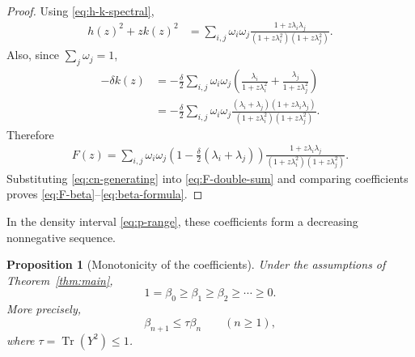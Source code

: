 \documentclass[11pt]{article}
\newtheorem{proposition}[theorem]{Proposition}
\newcommand{\Tr}{\operatorname{Tr}}
\begin{document}
\begin{proof}
Using \eqref{eq:h-k-spectral},
\begin{align*}
 h(z)^2+zk(z)^2
 &=\sum_{i,j}\omega_i\omega_j
   \frac{1+z\lambda_i\lambda_j}
   {(1+z\lambda_i^2)(1+z\lambda_j^2)}.
\end{align*}
Also, since $\sum_j\omega_j=1$,
\begin{align*}
 -\delta k(z)
 &=-\frac{\delta}{2}\sum_{i,j}\omega_i\omega_j
 \left(
   \frac{\lambda_i}{1+z\lambda_i^2}
   +\frac{\lambda_j}{1+z\lambda_j^2}
 \right)\\
 &=-\frac{\delta}{2}\sum_{i,j}\omega_i\omega_j
 \frac{(\lambda_i+\lambda_j)(1+z\lambda_i\lambda_j)}
 {(1+z\lambda_i^2)(1+z\lambda_j^2)}.
\end{align*}
Therefore
\begin{align}
 F(z)
 =\sum_{i,j}\omega_i\omega_j
 \left(1-\frac{\delta}{2}(\lambda_i+\lambda_j)\right)
 \frac{1+z\lambda_i\lambda_j}
 {(1+z\lambda_i^2)(1+z\lambda_j^2)}.
 \label{eq:F-double-sum}
\end{align}
Substituting \eqref{eq:cn-generating} into \eqref{eq:F-double-sum} and comparing coefficients proves \eqref{eq:F-beta}--\eqref{eq:beta-formula}.
\end{proof}

In the density interval \eqref{eq:p-range}, these coefficients form a decreasing nonnegative sequence.

\begin{proposition}[Monotonicity of the coefficients]\label{prop:beta-monotone}
Under the assumptions of Theorem~\ref{thm:main},
\begin{equation}
   1=\beta_0\ge\beta_1\ge\beta_2\ge\cdots\ge0.
   \label{eq:beta-monotone}
\end{equation}
More precisely,
\begin{equation}
   \beta_{n+1}\le\tau\beta_n
   \qquad(n\ge1),
   \label{eq:beta-recursive-bound}
\end{equation}
where $\tau=\Tr(Y^2)\le1$.
\end{proposition}
\end{document}
